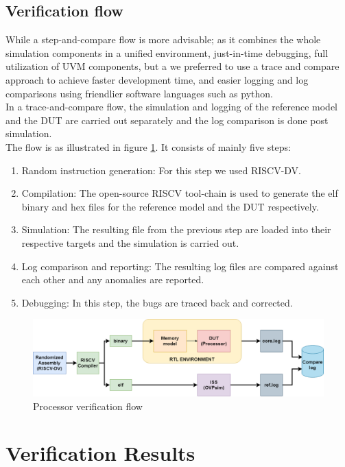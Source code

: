 \documentclass[../main.tex]{subfiles}
\begin{document}
\newpage
\subsection{Verification flow}
While a step-and-compare flow is more advisable; as it combines the whole simulation components in a unified environment, just-in-time debugging, full utilization of UVM components, but a we preferred to use a trace and compare approach to achieve faster development time, and easier logging and log comparisons using friendlier software languages such as python.\\

\noindent In a trace-and-compare flow, the simulation and logging of the reference model and the DUT are carried out separately and the log comparison is done post simulation.\\

\noindent The flow is as illustrated in figure \ref{fig:UVM_flow}. It consists of mainly five steps:
\begin{enumerate}
    \item Random instruction generation: For this step we used RISCV-DV.
    \item Compilation: The open-source RISCV tool-chain is used to generate the elf binary and hex files for the reference model and the DUT respectively.
    \item Simulation: The resulting file from the previous step are loaded into their respective targets and the simulation is carried out.
    \item Log comparison and reporting: The resulting log files are compared against each other and any anomalies are reported.
    \item Debugging: In this step, the bugs are traced back and corrected.
\end{enumerate}

\begin{figure}[h!]
\centering
\includegraphics[scale = 0.4]{diagrams/UVM_FLOW.png}

\caption{Processor verification flow}
\label{fig:UVM_flow}
\end{figure}

\section{Verification Results}
\end{document}

